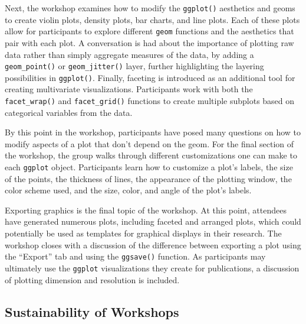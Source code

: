 \documentclass[12pt]{article}
\begin{document}
\quad Next, the workshop examines how to modify the \texttt{ggplot()} aesthetics and geoms to create violin plots, density plots, bar charts, and line plots. Each of these plots allow for participants to explore different \texttt{geom} functions and the aesthetics that pair with each plot. A conversation is had about the importance of plotting raw data rather than simply aggregate measures of the data, by adding a \texttt{geom\_point()} or \texttt{geom\_jitter()} layer, further highlighting the layering possibilities in \texttt{ggplot()}. Finally, faceting is introduced as an additional tool for creating multivariate visualizations. Participants work with both the \texttt{facet\_wrap()} and \texttt{facet\_grid()} functions to create multiple subplots based on categorical variables from the data. 

\quad By this point in the workshop, participants have posed many questions on how to modify aspects of a plot that don't depend on the geom. For the final section of the workshop, the group walks through different customizations one can make to each \texttt{ggplot} object. Participants learn how to customize a plot's labels, the size of the points, the thickness of lines, the appearance of the plotting window, the color scheme used, and the size, color, and angle of the plot's labels. 

\quad Exporting graphics is the final topic of the workshop. At this point, attendees have generated numerous plots, including faceted and arranged plots, which could potentially be used as templates for graphical displays in their research. The workshop closes with a discussion of the difference between exporting a plot using the ``Export'' tab and using the \texttt{ggsave()} function. As participants may ultimately use the \texttt{ggplot} visualizations they create for publications, a discussion of plotting dimension and resolution is included. 


\subsection{Sustainability of Workshops}  
\end{document}
